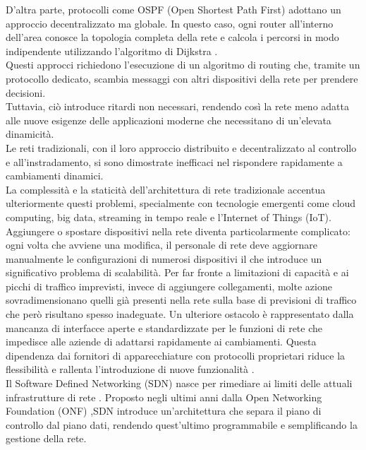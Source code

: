 D'altra parte, protocolli come OSPF (Open Shortest Path First) adottano un approccio decentralizzato ma globale.
In questo caso, ogni router all'interno dell'area conosce la topologia completa della rete e calcola i percorsi in modo indipendente utilizzando l'algoritmo di Dijkstra \cite{ospf}. 
\\Questi approcci richiedono l'esecuzione di un algoritmo di routing che, tramite un protocollo dedicato, 
scambia messaggi con altri dispositivi della rete per prendere decisioni.
\\Tuttavia, ciò introduce ritardi non necessari, rendendo così la rete meno adatta alle nuove esigenze delle applicazioni moderne che necessitano di un'elevata dinamicità.
\\Le reti tradizionali, con il loro approccio distribuito e decentralizzato al controllo e all'instradamento, si sono dimostrate inefficaci nel rispondere rapidamente a cambiamenti dinamici.
\\La complessità e la staticità dell'architettura di rete tradizionale accentua ulteriormente questi problemi, specialmente con tecnologie emergenti come cloud computing, big data, streaming in tempo reale e l'Internet of Things (IoT).
\\Aggiungere o spostare dispositivi nella rete diventa particolarmente complicato: ogni volta che avviene una modifica, il personale di rete deve aggiornare manualmente le configurazioni di numerosi dispositivi il che introduce un significativo problema di scalabilità.
Per far fronte a limitazioni di capacità e ai picchi di traffico imprevisti, invece di aggiungere collegamenti, molte azione sovradimensionano quelli già presenti nella rete sulla base di previsioni di traffico che però risultano spesso inadeguate.
Un ulteriore ostacolo è rappresentato dalla mancanza di interfacce aperte e standardizzate per le funzioni di rete che impedisce alle aziende di adattarsi rapidamente ai cambiamenti.
 Questa dipendenza dai fornitori di apparecchiature con protocolli proprietari riduce la flessibilità e rallenta l'introduzione di nuove funzionalità \cite{probtrad}.
\\Il Software Defined Networking (SDN) nasce per rimediare ai limiti delle attuali infrastrutture di rete \cite{sdnsurvey}.
Proposto negli ultimi anni dalla Open Networking Foundation (ONF) \cite{ONF},SDN introduce un'architettura che separa il piano di controllo dal piano dati, rendendo quest'ultimo programmabile e semplificando la gestione della rete. 
